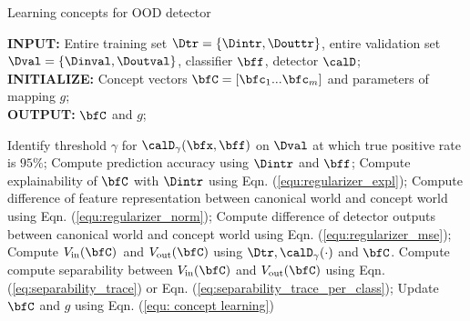 %
%

\begin{algorithm}[t]
\caption{Learning concepts for OOD detector}
\label{alg:concept_learning}
\textbf{INPUT:} Entire training set $\Dtr = \{\Dintr, \Douttr\}$, entire validation set $\Dval = \{\Dinval, \Doutval\}$, classifier $\bff$, detector $\calD$; \\
\textbf{INITIALIZE:} Concept vectors $\bfC = [\bfc_1 ... \bfc_m]$ and parameters of mapping $g$; \\
\textbf{OUTPUT:} $\bfC$ and $g$;
\begin{algorithmic}[1]
  \STATE Identify threshold $\gamma$ for $\calD_\gamma(\bfx, \bff)$ on $\Dval$ at which true positive rate is $95\%$;
    \STATE Compute prediction accuracy using $\Dintr$ and $\bff$;
    \STATE Compute explainability of $\bfC$ with $\Dintr$ using Eqn. (\ref{equ:regularizer_expl});
	\STATE Compute difference of feature representation between canonical world and concept world using Eqn. (\ref{equ:regularizer_norm});
	\STATE Compute difference of detector outputs between canonical world and concept world using Eqn. (\ref{equ:regularizer_mse});
	\STATE Compute $V_{\textrm{in}}(\bfC)$~\footnotemark and $V_{\textrm{out}}(\bfC)$ using $\Dtr, \calD_\gamma(\cdot)$ and $\bfC$.
	Compute compute separability between $V_{\textrm{in}}(\bfC)$ and $V_{\textrm{out}}(\bfC)$ using Eqn. (\ref{eq:separability_trace}) or Eqn. (\ref{eq:separability_trace_per_class});
    \STATE Update $\bfC$ and $g$ using Eqn. (\ref{equ: concept learning})
  \ENDFOR
\end{algorithmic}
\end{algorithm}

